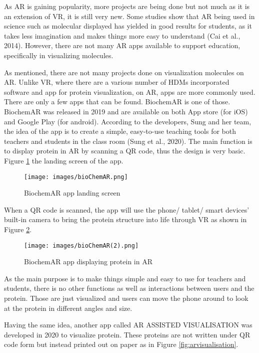 As AR is gaining popularity, more projects are being done but not much as it is an extension of VR, it is still very new. Some studies show that AR being used in science such as molecular displayed has yielded in good results for students, as it takes less imagination and makes things more easy to understand (Cai et al., 2014). However, there are not many AR apps available to support education, specifically in visualizing molecules. 

As mentioned, there are not many projects done on visualization molecules on AR. Unlike VR, where there are a various number of HDMs incorporated software and app for protein visualization, on AR, apps are more commonly used. There are only a few apps that can be found. BiochemAR is one of those. BiochemAR was released in 2019 and are available on both App store (for iOS) and Google Play (for android). According to the developers, Sung and her team, the idea of the app is to create a simple, easy-to-use teaching tools for both teachers and students in the class room (Sung et al., 2020). The main function is to display protein in AR by scanning a QR code, thus the design is very basic. Figure \ref{fig:bioChemAR1} the landing screen of the app.

\begin{figure}[!htbp]
	\centering
	\texttt{[image: images/bioChemAR.png]}
	\caption{BiochemAR app landing screen}
	\label{fig:bioChemAR1}
\end{figure}

When a QR code is scanned, the app will use the phone/ tablet/ smart devices’ built-in camera to bring the protein structure into life through VR as shown in Figure \ref{fig:bioChemAR2}.

\begin{figure}[!htbp]
	\centering
	\texttt{[image: images/bioChemAR(2).png]}
	\caption{BiochemAR app displaying protein in AR}
	\label{fig:bioChemAR2}
\end{figure}

As the main purpose is to make things simple and easy to use for teachers and students, there is no other functions as well as interactions between users and the protein. Those are just visualized and users can move the phone around to look at the protein in different angles and size. 

Having the same idea, another app called {\footnotesize AR ASSISTED VISUALISATION}
was developed in 2020 to visualize protein. These proteins are not written under QR code form but instead printed out on paper as in Figure \ref{fig:arvisualisation}. 

